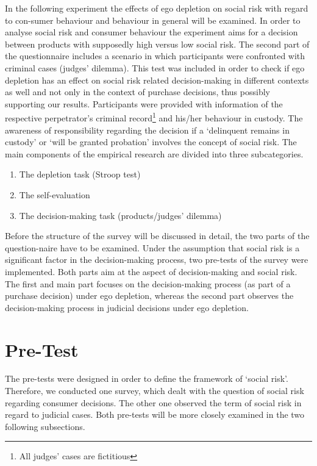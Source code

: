 In the following experiment the effects of ego depletion on social risk with regard to con-sumer behaviour and behaviour in general will be examined. In order to analyse social risk and consumer behaviour the experiment aims for a decision between products with supposedly high versus low social risk. The second part of the questionnaire includes a scenario in which participants were confronted with criminal cases (judges’ dilemma). This test was included in order to check if ego depletion has an effect on social risk related decision-making in different contexts as well and not only in the context of purchase decisions, thus possibly supporting our results. Participants were provided with information of the respective perpetrator’s criminal record\footnote{All judges’ cases are fictitious} and his/her behaviour in custody. The awareness of responsibility regarding the decision if a ‘delinquent remains in custody’ or ‘will be granted probation’ involves the concept of social risk.
The main components of the empirical research are divided into three subcategories. 
\begin{enumerate}
\item The depletion task (Stroop test)
\item The self-evaluation 
\item The decision-making task (products/judges’ dilemma)
\end{enumerate}
Before the structure of the survey will be discussed in detail, the two parts of the question-naire have to be examined. Under the assumption that social risk is a significant factor in the decision-making process, two pre-tests of the survey were implemented. Both parts aim at the aspect of decision-making and social risk. The first and main part focuses on the decision-making process (as part of a purchase decision) under ego depletion, whereas the second part observes the decision-making process in judicial decisions under ego depletion. 
\section{Pre-Test}
The pre-tests were designed in order to define the framework of ‘social risk’. Therefore, we conducted one survey, which dealt with the question of social risk regarding consumer decisions. The other one observed the term of social risk in regard to judicial cases. Both pre-tests will be more closely examined in the two following subsections.
